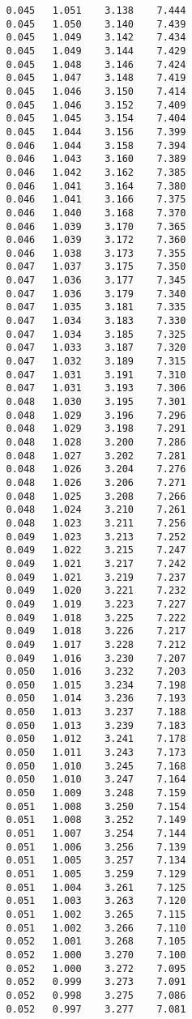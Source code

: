 \begin{verbatim}
   0.045   1.051    3.138    7.444
   0.045   1.050    3.140    7.439
   0.045   1.049    3.142    7.434
   0.045   1.049    3.144    7.429
   0.045   1.048    3.146    7.424
   0.045   1.047    3.148    7.419
   0.045   1.046    3.150    7.414
   0.045   1.046    3.152    7.409
   0.045   1.045    3.154    7.404
   0.045   1.044    3.156    7.399
   0.046   1.044    3.158    7.394
   0.046   1.043    3.160    7.389
   0.046   1.042    3.162    7.385
   0.046   1.041    3.164    7.380
   0.046   1.041    3.166    7.375
   0.046   1.040    3.168    7.370
   0.046   1.039    3.170    7.365
   0.046   1.039    3.172    7.360
   0.046   1.038    3.173    7.355
   0.047   1.037    3.175    7.350
   0.047   1.036    3.177    7.345
   0.047   1.036    3.179    7.340
   0.047   1.035    3.181    7.335
   0.047   1.034    3.183    7.330
   0.047   1.034    3.185    7.325
   0.047   1.033    3.187    7.320
   0.047   1.032    3.189    7.315
   0.047   1.031    3.191    7.310
   0.047   1.031    3.193    7.306
   0.048   1.030    3.195    7.301
   0.048   1.029    3.196    7.296
   0.048   1.029    3.198    7.291
   0.048   1.028    3.200    7.286
   0.048   1.027    3.202    7.281
   0.048   1.026    3.204    7.276
   0.048   1.026    3.206    7.271
   0.048   1.025    3.208    7.266
   0.048   1.024    3.210    7.261
   0.048   1.023    3.211    7.256
   0.049   1.023    3.213    7.252
   0.049   1.022    3.215    7.247
   0.049   1.021    3.217    7.242
   0.049   1.021    3.219    7.237
   0.049   1.020    3.221    7.232
   0.049   1.019    3.223    7.227
   0.049   1.018    3.225    7.222
   0.049   1.018    3.226    7.217
   0.049   1.017    3.228    7.212
   0.049   1.016    3.230    7.207
   0.050   1.016    3.232    7.203
   0.050   1.015    3.234    7.198
   0.050   1.014    3.236    7.193
   0.050   1.013    3.237    7.188
   0.050   1.013    3.239    7.183
   0.050   1.012    3.241    7.178
   0.050   1.011    3.243    7.173
   0.050   1.010    3.245    7.168
   0.050   1.010    3.247    7.164
   0.050   1.009    3.248    7.159
   0.051   1.008    3.250    7.154
   0.051   1.008    3.252    7.149
   0.051   1.007    3.254    7.144
   0.051   1.006    3.256    7.139
   0.051   1.005    3.257    7.134
   0.051   1.005    3.259    7.129
   0.051   1.004    3.261    7.125
   0.051   1.003    3.263    7.120
   0.051   1.002    3.265    7.115
   0.051   1.002    3.266    7.110
   0.052   1.001    3.268    7.105
   0.052   1.000    3.270    7.100
   0.052   1.000    3.272    7.095
   0.052   0.999    3.273    7.091
   0.052   0.998    3.275    7.086
   0.052   0.997    3.277    7.081

\end{verbatim}
